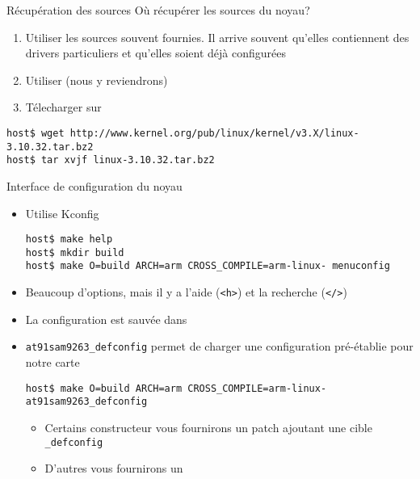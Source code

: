 \begin{frame}[fragile=singleslide]{Récupération des sources}
  Où récupérer les sources du noyau?
  \begin{enumerate}
  \item Utiliser  les sources souvent fournies.  Il arrive souvent
    qu'elles  contiennent  des  drivers particuliers  et  qu'elles
    soient déjà configurées
  \item Utiliser  (nous y reviendrons)
  \item Télecharger sur 
  \end{enumerate}
  \begin{lstlisting}
host$ wget http://www.kernel.org/pub/linux/kernel/v3.X/linux-3.10.32.tar.bz2
host$ tar xvjf linux-3.10.32.tar.bz2
  \end{lstlisting}
\end{frame}

\begin{frame}[fragile=singleslide]{Interface de configuration du noyau}
  \begin{itemize}
    \item Utilise Kconfig
      \begin{lstlisting}
host$ make help
host$ mkdir build
host$ make O=build ARCH=arm CROSS_COMPILE=arm-linux- menuconfig
       \end{lstlisting}
     \item  Beaucoup d'options,  mais il  y a  l'aide (\verb+<h>+)  et la
       recherche (\verb+</>+)
    \item La configuration est sauvée dans 
    \item    \verb+at91sam9263_defconfig+   permet   de    charger   une
      configuration pré-établie pour notre carte
      \begin{lstlisting}
host$ make O=build ARCH=arm CROSS_COMPILE=arm-linux- at91sam9263_defconfig
      \end{lstlisting}
    \begin{itemize}
    \item Certains constructeur vous  fournirons un patch ajoutant une
      cible \verb+_defconfig+
    \item D'autres vous fournirons un 
    \end{itemize}
  \end{itemize}
\end{frame}


